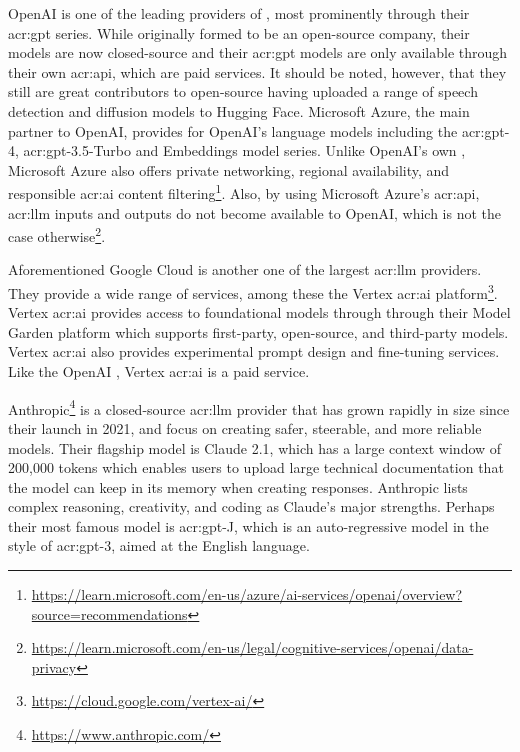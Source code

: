 OpenAI is one of the leading providers of , most prominently through their \acrshort{acr:gpt} series. While originally formed to be an open-source company, their models are now closed-source and their \acrshort{acr:gpt} models are only available through their own \acrshort{acr:api}, which are paid services. It should be noted, however, that they still are great contributors to open-source having uploaded a range of speech detection and diffusion models to Hugging Face. Microsoft Azure, the main partner to OpenAI, provides  for OpenAI's language models including the \acrshort{acr:gpt}-4, \acrshort{acr:gpt}-3.5-Turbo and Embeddings model series. Unlike OpenAI's own , Microsoft Azure also offers private networking, regional availability, and responsible \acrshort{acr:ai} content filtering\footnote{\url{https://learn.microsoft.com/en-us/azure/ai-services/openai/overview?source=recommendations}}. Also, by using Microsoft Azure's \acrshort{acr:api}, \acrshort{acr:llm} inputs and outputs do not become available to OpenAI, which is not the case otherwise\footnote{\url{https://learn.microsoft.com/en-us/legal/cognitive-services/openai/data-privacy}}.

Aforementioned Google Cloud is another one of the largest \acrshort{acr:llm} providers. They provide a wide range of services, among these the Vertex \acrshort{acr:ai} platform\footnote{\url{https://cloud.google.com/vertex-ai/}}. Vertex \acrshort{acr:ai} provides access to foundational models through  through their Model Garden platform which supports first-party, open-source, and third-party models. Vertex \acrshort{acr:ai} also provides experimental prompt design and fine-tuning services. Like the OpenAI , Vertex \acrshort{acr:ai} is a paid service.

Anthropic\footnote{\url{https://www.anthropic.com/}} is a closed-source \acrshort{acr:llm} provider that has grown rapidly in size since their launch in 2021, and focus on creating safer, steerable, and more reliable models. Their flagship model is Claude 2.1, which has a large context window of 200,000 tokens which enables users to upload large technical documentation that the model can keep in its memory when creating responses. Anthropic lists complex reasoning, creativity, and coding as Claude's major strengths. Perhaps their most famous model is \acrshort{acr:gpt}-J, which is an auto-regressive model in the style of \acrshort{acr:gpt}-3, aimed at the English language.


